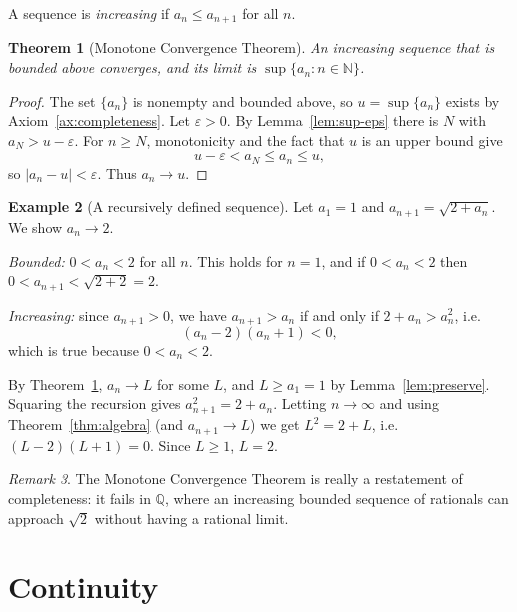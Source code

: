 \documentclass[11pt,a4paper]{book}
\newcommand{\N}{\mathbb{N}}
\newcommand{\Q}{\mathbb{Q}}
\newcommand{\abs}[1]{\left|#1\right|}
\numberwithin{equation}{section}          %
\theoremstyle{plain}
\newtheorem{theorem}{Theorem}[section]    %
\theoremstyle{definition}
\newtheorem{example}[theorem]{Example}
\theoremstyle{remark}
\newtheorem{remark}[theorem]{Remark}
\begin{document}
A sequence is \emph{increasing} if $a_n\le a_{n+1}$ for all $n$.

\begin{theorem}[Monotone Convergence Theorem]\label{thm:mct}
An increasing sequence that is bounded above converges, and its limit is $\sup\{a_n:n\in\N\}$.
\end{theorem}

\begin{proof}
The set $\{a_n\}$ is nonempty and bounded above, so $u=\sup\{a_n\}$ exists by Axiom~\ref{ax:completeness}. Let $\varepsilon>0$. By Lemma~\ref{lem:sup-eps} there is $N$ with $a_N>u-\varepsilon$. For $n\ge N$, monotonicity and the fact that $u$ is an upper bound give
\[
    u-\varepsilon<a_N\le a_n\le u,
\]
so $\abs{a_n-u}<\varepsilon$. Thus $a_n\to u$.
\end{proof}

\begin{example}[A recursively defined sequence]\label{ex:recursive}
Let $a_1=1$ and $a_{n+1}=\sqrt{2+a_n}$. We show $a_n\to2$.

\emph{Bounded:} $0<a_n<2$ for all $n$. This holds for $n=1$, and if $0<a_n<2$ then $0<a_{n+1}<\sqrt{2+2}=2$.

\emph{Increasing:} since $a_{n+1}>0$, we have $a_{n+1}>a_n$ if and only if $2+a_n>a_n^2$, i.e.
\begin{equation}\label{eq:recursive-ineq}
    (a_n-2)(a_n+1)<0,
\end{equation}
which is true because $0<a_n<2$.

By Theorem~\ref{thm:mct}, $a_n\to L$ for some $L$, and $L\ge a_1=1$ by Lemma~\ref{lem:preserve}. Squaring the recursion gives $a_{n+1}^2=2+a_n$. Letting $n\to\infty$ and using Theorem~\ref{thm:algebra} (and $a_{n+1}\to L$) we get $L^2=2+L$, i.e. $(L-2)(L+1)=0$. Since $L\ge1$, $L=2$.
\end{example}

\begin{remark}
The Monotone Convergence Theorem is really a restatement of completeness: it fails in $\Q$, where an increasing bounded sequence of rationals can approach $\sqrt2$ without having a rational limit.
\end{remark}

\section{Continuity}\label{sec:continuity}
\end{document}
